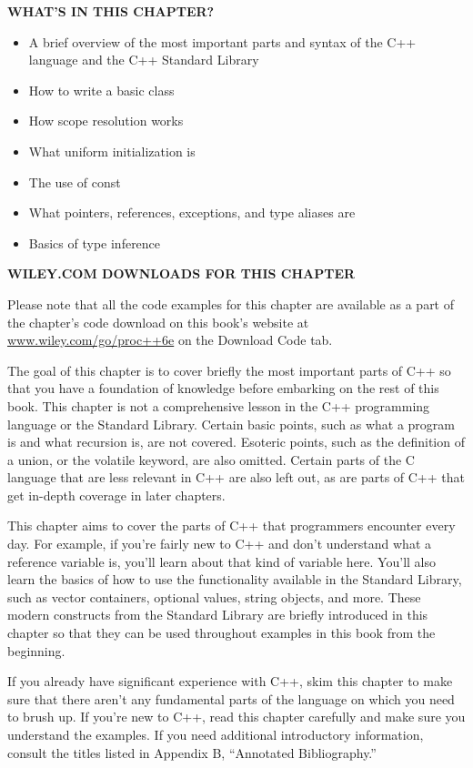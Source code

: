 
\noindent
\textbf{WHAT’S IN THIS CHAPTER?}

\begin{itemize}
\item
A brief overview of the most important parts and syntax of the C++ language and the C++ Standard Library

\item
How to write a basic class

\item
How scope resolution works

\item
What uniform initialization is

\item
The use of const

\item
What pointers, references, exceptions, and type aliases are

\item
Basics of type inference
\end{itemize}

\noindent
\textbf{WILEY.COM DOWNLOADS FOR THIS CHAPTER}

Please note that all the code examples for this chapter are available as a part of the chapter’s code download on this book’s website at \url{www.wiley.com/go/proc++6e} on the Download Code tab.

The goal of this chapter is to cover briefly the most important parts of C++ so that you have a foundation of knowledge before embarking on the rest of this book. This chapter is not a comprehensive lesson in the C++ programming language or the Standard Library. Certain basic points, such as what a program is and what recursion is, are not covered. Esoteric points, such as the definition of a union, or the volatile keyword, are also omitted. Certain parts of the C language that are less relevant in C++ are also left out, as are parts of C++ that get in-depth coverage in later chapters.

This chapter aims to cover the parts of C++ that programmers encounter every day. For example, if you’re fairly new to C++ and don’t understand what a reference variable is, you’ll learn about that kind of variable here. You’ll also learn the basics of how to use the functionality available in the Standard Library, such as vector containers, optional values, string objects, and more. These modern constructs from the Standard Library are briefly introduced in this chapter so that they can be used throughout examples in this book from the beginning.

If you already have significant experience with C++, skim this chapter to make sure that there aren’t any fundamental parts of the language on which you need to brush up. If you’re new to C++, read this chapter carefully and make sure you understand the examples. If you need additional introductory information, consult the titles listed in Appendix B, “Annotated Bibliography.”








